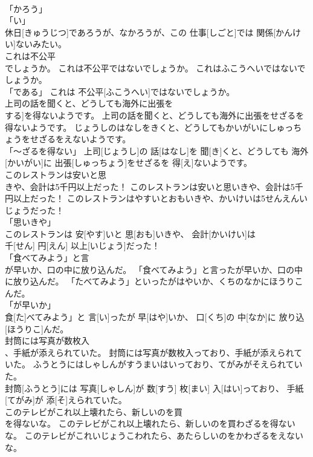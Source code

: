 \documentclass[8pt]{extreport}
\begin{document}
\begin{CJK}{UTF8}{min}
\\	「かろう」 
\\	「い」 
\\	休日[きゅうじつ]であろうが、なかろうが、この 仕事[しごと]では 関係[かんけい]ないみたい。		
\\	これは不公平
\\	でしょうか。	これは不公平ではないでしょうか。	これはふこうへいではないでしょうか。	
\\	「である」	これは 不公平[ふこうへい]ではないでしょうか。		
\\	上司の話を聞くと、どうしても海外に出張を
\\	する]を得ないようです。	上司の話を聞くと、どうしても海外に出張をせざるを得ないようです。	じょうしのはなしをきくと、どうしてもかいがいにしゅっちょうをせざるをえないようです。	
\\	「～ざるを得ない」	上司[じょうし]の 話[はなし]を 聞[き]くと、どうしても 海外[かいがい]に 出張[しゅっちょう]をせざるを 得[え]ないようです。		
\\	このレストランは安いと思
\\	きや、会計は5千円以上だった！	このレストランは安いと思いきや、会計は5千円以上だった！	このレストランはやすいとおもいきや、かいけいは5せんえんいじょうだった！	
\\	「思いきや」 
\\	このレストランは 安[やす]いと 思[おも]いきや、 会計[かいけい]は 
\\	千[せん] 円[えん] 以上[いじょう]だった！		
\\	「食べてみよう」と言
\\	が早いか、口の中に放り込んだ。	「食べてみよう」と言ったが早いか、口の中に放り込んだ。	「たべてみよう」といったがはやいか、くちのなかにほうりこんだ。	
\\	「が早いか」 
\\	食[た]べてみよう」と 言[い]ったが 早[はや]いか、 口[くち]の 中[なか]に 放り込[ほうりこ]んだ。		
\\	封筒には写真が数枚入
\\	、手紙が添えられていた。	封筒には写真が数枚入っており、手紙が添えられていた。	ふうとうにはしゃしんがすうまいはいっており、てがみがそえられていた。	
\\	封筒[ふうとう]には 写真[しゃしん]が 数[すう] 枚[まい] 入[はい]っており、 手紙[てがみ]が 添[そ]えられていた。		
\\	このテレビがこれ以上壊れたら、新しいのを買
\\	を得ないな。	このテレビがこれ以上壊れたら、新しいのを買わざるを得ないな。	このテレビがこれいじょうこわれたら、あたらしいのをかわざるをえないな。	

\end{CJK}
\end{document}
